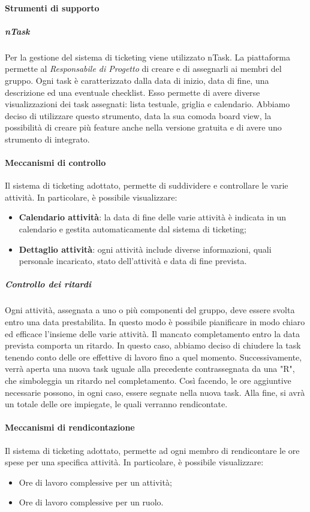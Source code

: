 \paragraph{Strumenti di supporto}
\subparagraph{nTask} \Spazio
Per la gestione del sistema di ticketing viene utilizzato nTask. La piattaforma permette al \emph{Responsabile di Progetto} di creare  e di assegnarli ai membri del gruppo. Ogni task è caratterizzato dalla data di inizio, data di fine, una descrizione ed una eventuale checklist. Esso permette di avere diverse visualizzazioni dei task assegnati: lista testuale, griglia e calendario. Abbiamo deciso di utilizzare questo strumento, data la sua comoda board view, la possibilità di creare più feature anche nella versione gratuita e di avere uno strumento di  integrato.

\paragraph{Meccanismi di controllo} \Spazio
Il sistema di ticketing adottato, permette di suddividere e controllare le varie attività. In particolare, è possibile visualizzare:
\begin{itemize}
\item{\textbf{Calendario attività}}: la data di fine delle varie attività è indicata in un calendario e gestita automaticamente dal sistema di ticketing;  
\item{\textbf{Dettaglio attività}}: ogni attività include diverse informazioni, quali personale incaricato, stato dell'attività e data di fine prevista. 
\end{itemize}
\subparagraph{Controllo dei ritardi} \Spazio
Ogni attività, assegnata a uno o più componenti del gruppo, deve essere svolta entro una data prestabilita. In questo modo è possibile pianificare in modo chiaro ed efficace l'insieme delle varie attività. Il mancato completamento entro la data prevista comporta un ritardo. In questo caso, abbiamo deciso di chiudere la task tenendo conto delle ore effettive di lavoro fino a quel momento. Successivamente, verrà aperta una nuova task uguale alla precedente contrassegnata da una "R", che simboleggia un ritardo nel completamento. Così facendo, le ore aggiuntive necessarie possono, in ogni caso, essere segnate nella nuova task. Alla fine, si avrà un totale delle ore impiegate, le quali verranno rendicontate.

\paragraph{Meccanismi di rendicontazione} \Spazio
Il sistema di ticketing adottato, permette ad ogni membro di rendicontare le ore spese per una specifica attività. In particolare, è possibile visualizzare:
\begin{itemize}
\item{Ore di lavoro complessive per un attività;}
\item{Ore di lavoro complessive per un ruolo.}
\end{itemize}

